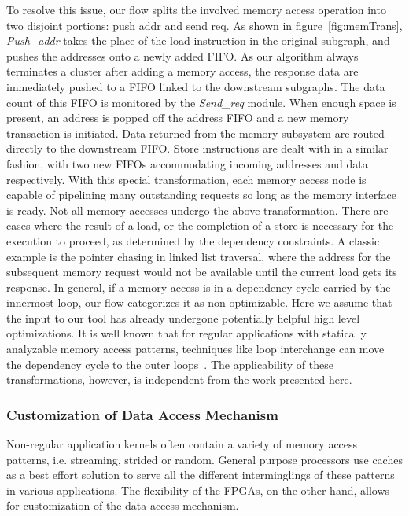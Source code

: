 To resolve this issue, our flow splits the involved
memory access operation into two disjoint portions:
push addr and send req. As shown in figure~\ref{fig:memTrans}, \textit{Push\_addr}
takes the place of the load instruction in the original subgraph,
and pushes the addresses onto a newly added FIFO. As our
algorithm always terminates a cluster after adding a memory
access, the response data are immediately pushed to a FIFO
linked to the downstream subgraphs. The data count of this FIFO
is monitored by the \textit{Send\_req} module. When enough space
is present, an address is popped off the address FIFO and
a new memory transaction is initiated. Data returned from
the memory subsystem are routed directly to the downstream
FIFO. Store instructions are dealt with in a similar fashion,
with two new FIFOs accommodating incoming addresses
and data respectively. With this special transformation, each
memory access node is capable of pipelining many outstanding
requests so long as the memory interface is ready.
Not all memory accesses undergo the above transformation.
There are cases where the result of a load, or the completion of
a store is necessary for the execution to proceed, as determined
by the dependency constraints. A classic example is the pointer
chasing in linked list traversal, where the address for the
subsequent memory request would not be available until the
current load gets its response. In general, if a memory access
is in a dependency cycle carried by the innermost loop, our
flow categorizes it as non-optimizable. Here we assume that
the input to our tool has already undergone potentially helpful
high level optimizations. It is well known that for regular
applications with statically analyzable memory access patterns,
techniques like loop interchange can move the dependency
cycle to the outer loops~\cite{Kennedy:2001:OCM:502981}. The applicability of these
transformations, however, is independent from the work presented here.


\subsubsection{Customization of Data Access Mechanism}
Non-regular application kernels often contain a variety of
memory access patterns, i.e. streaming, strided or random.
General purpose processors use caches as a best effort solution
to serve all the different interminglings of these patterns in
various applications. The flexibility of the FPGAs, on the other
hand, allows for customization of the data access mechanism.


